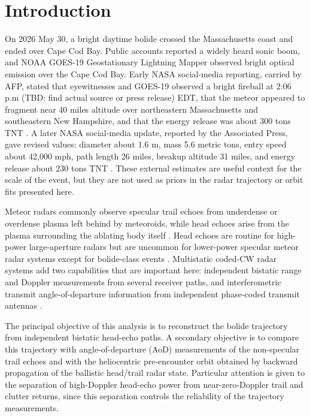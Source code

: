 \section{Introduction}

On 2026 May 30, a bright daytime bolide crossed the Massachusetts coast and
ended over Cape Cod Bay.  Public accounts reported a widely heard sonic boom,
and NOAA GOES-19 Geostationary Lightning Mapper observed bright optical emission over the Cape Cod Bay.
Early NASA social-media reporting, carried by AFP, stated that eyewitnesses and GOES-19 
observed a bright fireball at 2:06 p.m (TBD: find actual source or press release) EDT, 
that the meteor appeared to fragment near 40 miles altitude over
northeastern Massachusetts and southeastern New Hampshire, and that the energy
release was about 300 tons TNT \cite{afp_2026_new_england_meteor}.  A later
NASA social-media update, reported by the Associated Press, gave revised
values: diameter about 1.6 m, mass 5.6 metric tons, entry speed about
42,000 mph, path length 26 miles, breakup altitude 31 miles, and energy release
about 230 tons TNT \cite{ap_2026_new_england_meteor}.  These external
estimates are useful context for the scale of the event, but they are not used
as priors in the radar trajectory or orbit fits presented here.

Meteor radars commonly observe specular trail echoes from underdense or
overdense plasma left behind by meteoroids, while head echoes arise from the
plasma surrounding the ablating body itself \cite{mckinley_1961,close_2007}.
Head echoes are routine for high-power large-aperture radars but are uncommon
for lower-power specular meteor radar systems except for bolide-class events
\cite{close_2007,kero_2012_head,marshall2017plasma,
vierinen_2022_pajala}.  Multistatic coded-CW radar systems
add two capabilities that are important here: independent bistatic range and
Doppler measurements from several receiver paths, and interferometric
transmit angle-of-departure information from independent phase-coded transmit
antennas \cite{vierinen_2016_mimo,chau_2019_mimo,chau_2021_peru}.

The principal objective of this analysis is to reconstruct the bolide
trajectory from independent bistatic head-echo paths.  A secondary objective is
to compare this trajectory with angle-of-departure (AoD) measurements of the
non-specular trail echoes and with the heliocentric pre-encounter orbit
obtained by backward propagation of the ballistic head/trail radar state.
Particular
attention is given to the separation of high-Doppler head-echo power from
near-zero-Doppler trail and clutter returns, since this separation controls the
reliability of the trajectory measurements.

